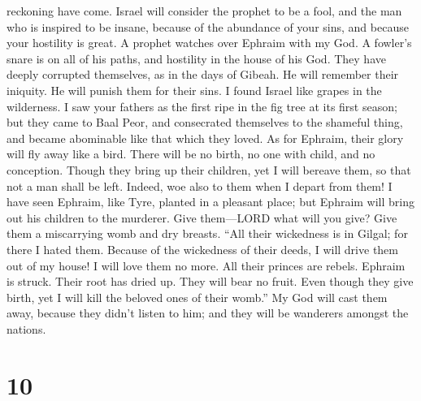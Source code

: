 reckoning have come. Israel will consider the prophet to be a fool, and
the man who is inspired to be insane, because of the abundance of your
sins, and because your hostility is great.  A prophet
watches over Ephraim with my God. A fowler's snare is on all of his
paths, and hostility in the house of his God.  They have
deeply corrupted themselves, as in the days of Gibeah. He will remember
their iniquity. He will punish them for their sins.  I
found Israel like grapes in the wilderness. I saw your fathers as the
first ripe in the fig tree at its first season; but they came to Baal
Peor, and consecrated themselves to the shameful thing, and became
abominable like that which they loved.  As for Ephraim,
their glory will fly away like a bird. There will be no birth, no one
with child, and no conception.  Though they bring up their
children, yet I will bereave them, so that not a man shall be left.
Indeed, woe also to them when I depart from them!  I have
seen Ephraim, like Tyre, planted in a pleasant place; but Ephraim will
bring out his children to the murderer.  Give them---LORD
what will you give? Give them a miscarrying womb and dry breasts.
 ``All their wickedness is in Gilgal; for there I hated
them. Because of the wickedness of their deeds, I will drive them out of
my house! I will love them no more. All their princes are rebels.
 Ephraim is struck. Their root has dried up. They will bear
no fruit. Even though they give birth, yet I will kill the beloved ones
of their womb.''  My God will cast them away, because they
didn't listen to him; and they will be wanderers amongst the nations.

\hypertarget{section-5}{%
\section{10}\label{section-5}}

